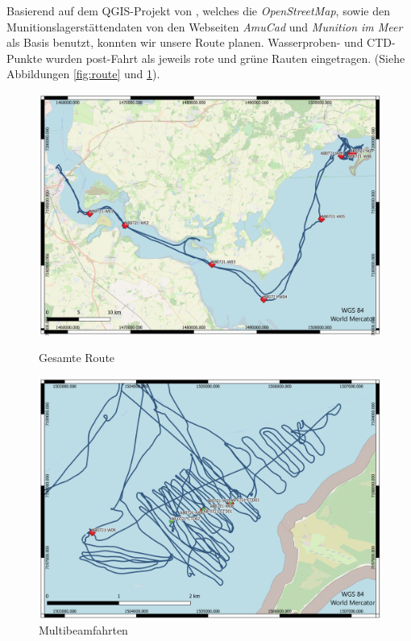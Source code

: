 Basierend auf dem QGIS-Projekt von \jens, welches die \emph{OpenStreetMap}, sowie 
den Munitionslagerstättendaten von den Webseiten \emph{AmuCad}\cite{amucad} und 
\emph{Munition im Meer}\cite{muninmeer} als Basis benutzt, konnten wir unsere Route 
planen. Wasserproben- und CTD-Punkte wurden post-Fahrt als jeweils rote und grüne 
Rauten eingetragen. (Siehe Abbildungen \ref{fig:route} und \ref{fig:multibeam_route}).
\begin{figure}[]
    \begin{minipage}{0.48\textwidth}
        \centering
        \includegraphics[width=1\linewidth]{Bilder/QGIS/Gesamte_route.png}
        \caption{Gesamte Route}
        \label{fig:route}
    \end{minipage}
    \begin{minipage}{0.48\textwidth}
        \centering
        \includegraphics[width=1\linewidth]{Bilder/QGIS/multibeam.png}
        \caption{Multibeamfahrten}
        \label{fig:multibeam_route}
    \end{minipage}
\end{figure}
